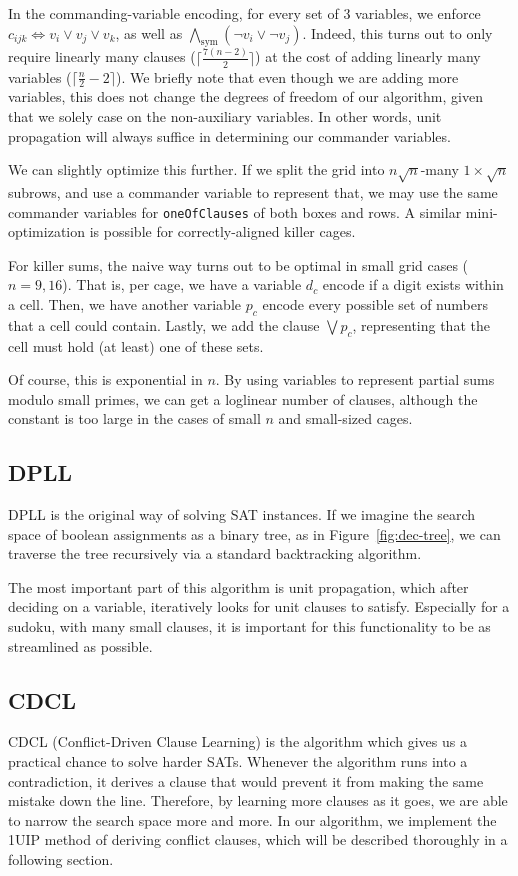 \documentclass{article}
\begin{document}
In the commanding-variable encoding, for every set of 3 variables, we enforce $c_{ijk} \iff v_i \lor v_j \lor v_k$, as well as $\bigwedge_{\text{sym}} (\neg v_i \lor \neg v_j)$.
Indeed, this turns out to only require linearly many clauses ($\lceil \frac{7(n-2)}{2} \rceil$) at the cost of adding linearly many variables ($\lceil \frac{n}{2}-2 \rceil$).
We briefly note that even though we are adding more variables, this does not change the degrees of freedom of our algorithm, given that we solely case on the non-auxiliary variables.
In other words, unit propagation will always suffice in determining our commander variables.

We can slightly optimize this further.
If we split the grid into $n\sqrt{n}$-many $1 \times \sqrt{n}$ subrows, and use a commander variable to represent that, we may use the same commander variables for \verb|oneOfClauses| of both boxes and rows.
A similar mini-optimization is possible for correctly-aligned killer cages.

For killer sums, the naive way turns out to be optimal in small grid cases ($n=9,16$).
That is, per cage, we have a variable $d_c$ encode if a digit exists within a cell.
Then, we have another variable $p_c$ encode every possible set of numbers that a cell could contain.
Lastly, we add the clause $\bigvee p_c$, representing that the cell must hold (at least) one of these sets.

Of course, this is exponential in $n$.
By using variables to represent partial sums modulo small primes, we can get a loglinear number of clauses, although the constant is too large in the cases of small $n$ and small-sized cages.

\subsection{DPLL}
DPLL is the original way of solving SAT instances.
If we imagine the search space of boolean assignments as a binary tree, as in Figure~\ref{fig:dec-tree}, we can traverse the tree recursively via a standard backtracking algorithm.

The most important part of this algorithm is unit propagation, which after deciding on a variable, iteratively looks for unit clauses to satisfy.
Especially for a sudoku, with many small clauses, it is important for this functionality to be as streamlined as possible.

\subsection{CDCL}
CDCL (Conflict-Driven Clause Learning) is the algorithm which gives us a practical chance to solve harder SATs.
Whenever the algorithm runs into a contradiction, it derives a clause that would prevent it from making the same mistake down the line.
Therefore, by learning more clauses as it goes, we are able to narrow the search space more and more.
In our algorithm, we implement the 1UIP method of deriving conflict clauses, which will be described thoroughly in a following section.
\end{document}
